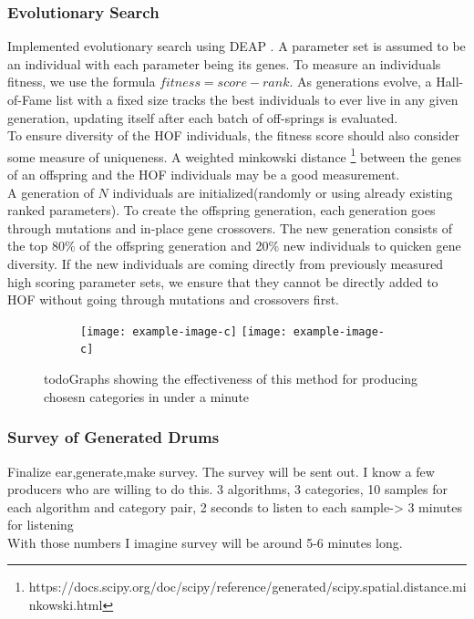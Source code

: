 \documentclass{nime-alternate} %
\begin{document}
\subsubsection{Evolutionary Search}
Implemented evolutionary search using DEAP \citep{DEAP_JMLR2012}. A parameter set is assumed to be an individual with each parameter being its genes. To measure an individuals fitness, we use the formula $fitness=score-rank$. As generations evolve, a Hall-of-Fame list with a fixed size tracks the best individuals to ever live in any given generation, updating itself after each batch of off-springs is evaluated.\\
To ensure diversity of the HOF individuals, the fitness score should also consider some measure of uniqueness. A weighted minkowski distance \footnote{https://docs.scipy.org/doc/scipy/reference/generated/scipy.spatial.distance.minkowski.html} between the genes of an offspring and the HOF individuals may be a good measurement.\\
A generation of $N$ individuals are initialized(randomly or using already existing ranked parameters). To create the offspring generation, each generation goes through mutations and in-place gene crossovers. The new generation consists of the top 80\% of the offspring generation and 20\% new individuals to quicken gene diversity. If the new individuals are coming directly from previously measured high scoring parameter sets, we ensure that they cannot be directly added to HOF without going through mutations and crossovers first.\\

\begin{figure}[H]
\centering
\begin{subfigure}[b]{\linewidth}
\texttt{[image: example-image-c]}
\texttt{[image: example-image-c]}
\label{fig:1stack}
\setcounter{subfigure}{2}%
\end{subfigure}
\caption{\colorbox{green!=40}{todo}Graphs showing the effectiveness of this method for producing chosesn categories in under a minute}
\label{fig:evo-graphs}
\end{figure}
\subsubsection{Survey of Generated Drums}
\label{survey}
\colorbox{green!=30}{Finalize ear,generate,make survey.} The survey will be sent out. I know a few producers who are willing to do this.
3 algorithms, 3 categories, 10 samples for each algorithm and category pair, 2 seconds to listen to each sample-> 3 minutes for listening\\
With those numbers I imagine survey will be around 5-6 minutes long.
\end{document}
